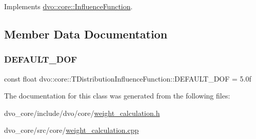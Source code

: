 Implements \mbox{\hyperlink{classdvo_1_1core_1_1_influence_function_a158082c763fa9de460e75a285bb91f1e}{dvo\+::core\+::\+Influence\+Function}}.



\subsection{Member Data Documentation}
\mbox{\label{classdvo_1_1core_1_1_t_distribution_influence_function_a7a64badce04fe13458febb2371d216dd}} 
\subsubsection{\texorpdfstring{D\+E\+F\+A\+U\+L\+T\+\_\+\+D\+OF}{DEFAULT\_DOF}}
{\footnotesize\ttfamily const float dvo\+::core\+::\+T\+Distribution\+Influence\+Function\+::\+D\+E\+F\+A\+U\+L\+T\+\_\+\+D\+OF = 5.\+0f\hspace{0.3cm}{\ttfamily [static]}}



The documentation for this class was generated from the following files\+:\begin{DoxyCompactItemize}
\item 
dvo\+\_\+core/include/dvo/core/\mbox{\hyperlink{weight__calculation_8h}{weight\+\_\+calculation.\+h}}\item 
dvo\+\_\+core/src/core/\mbox{\hyperlink{weight__calculation_8cpp}{weight\+\_\+calculation.\+cpp}}\end{DoxyCompactItemize}
